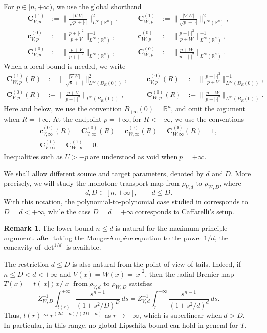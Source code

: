 \documentclass[11pt,a4paper,reqno]{amsart}
\numberwithin{equation}{section}
\theoremstyle{definition}
\newtheorem{remark}[theorem]{Remark}
\newcommand{\<}{\ensuremath \leq}
\renewcommand{\>}{\ensuremath \geq}
\newcommand{\Znorm}[2]{Z_{#1,#2}}
\newcommand{\CVp}[1]{\mathbf{C}_{V,#1}}
\newcommand{\CWp}[1]{\mathbf{C}_{W,#1}}
\newcommand{\cVp}[1]{\mathbf{c}_{V,#1}}
\newcommand{\cWp}[1]{\mathbf{c}_{W,#1}}
\begin{document}
For $p\in[n,+\infty)$, we use the global shorthand
\[
\begin{aligned}
\CVp{p}^{(1)}&:=\Biggl\| \frac{|\nabla V|}{\sqrt p+|\cdot|}\Biggr\|_{L^\infty(\mathbb{R}^n)}^2,
\qquad&
\CWp{p}^{(1)}&:=\Biggl\| \frac{|\nabla W|}{\sqrt p+|\cdot|}\Biggr\|_{L^\infty(\mathbb{R}^n)}^2,\\[1.2em]
\cVp{p}^{(0)}&:=\Biggl\|\frac{p+|\cdot|^2}{p+V}\Biggr\|_{L^\infty(\mathbb{R}^n)}^{-1},
\qquad&
\cWp{p}^{(0)}&:=\Biggl\|\frac{p+|\cdot|^2}{p+W}\Biggr\|_{L^\infty(\mathbb{R}^n)}^{-1},\\[1.2em]
\CVp{p}^{(0)}&:=\Biggl\|\frac{p+V}{p+|\cdot|^2}\Biggr\|_{L^\infty(\mathbb{R}^n)},
\qquad&
\CWp{p}^{(0)}&:=\Biggl\|\frac{p+W}{p+|\cdot|^2}\Biggr\|_{L^\infty(\mathbb{R}^n)}.
\end{aligned}
\]
When a local bound is needed, we write
\[
\begin{aligned}
\CWp{p}^{(1)}(R)&:=\Biggl\| \frac{|\nabla W|}{\sqrt p+|\cdot|}\Biggr\|_{L^\infty(B_R(0))}^2,
\qquad&
\cVp{p}^{(0)}(R)&:=\Biggl\|\frac{p+|\cdot|^2}{p+V}\Biggr\|_{L^\infty(B_R(0))}^{-1},\\[1.2em]
\CVp{p}^{(0)}(R)&:=\Biggl\|\frac{p+V}{p+|\cdot|^2}\Biggr\|_{L^\infty(B_R(0))},
\qquad&
\CWp{p}^{(0)}(R)&:=\Biggl\|\frac{p+W}{p+|\cdot|^2}\Biggr\|_{L^\infty(B_R(0))}.
\end{aligned}
\]
Here and below, we use the convention $B_{+\infty}(0)=\mathbb{R}^n$, and omit the argument when $R=+\infty$.
At the endpoint $p=+\infty$, for $R<+\infty$, we use the conventions
\[
\begin{gathered}
\cVp{\infty}^{(0)}(R)=\CVp{\infty}^{(0)}(R)
=\cWp{\infty}^{(0)}(R)=\CWp{\infty}^{(0)}(R)=1,\\
\CVp{\infty}^{(1)}=\CWp{\infty}^{(1)}=0.
\end{gathered}
\]
Inequalities such as $U>-p$ are understood as void when $p=+\infty$.

We shall allow different source and target parameters, denoted by $d$ and $D$. More precisely, we will study the monotone transport map from $\rho_{V,d}$ to $\rho_{W,D}$, where
\[
    d,D\in[n,+\infty], \qquad d\le D.
\]
With this notation, the polynomial-to-polynomial case studied in \cite{Alessio_Carlier_Santa,Fathi} corresponds to $D=d<+\infty$, while the case $D=d=+\infty$ corresponds to Caffarelli's setup.

\begin{remark}
The lower bound $n\le d$ is natural for the maximum-principle argument: after taking the Monge-Amp\`ere equation to the power $1/d$, the concavity of $\det^{1/d}$ is available.

The restriction $d\le D$ is also natural from the point of view of tails. Indeed, if $n\le D<d<+\infty$ and $V(x)=W(x)=|x|^2$, then the radial Brenier map $T(x)=t(|x|)x/|x|$ from $\rho_{V,d}$ to $\rho_{W,D}$ satisfies
\[
    \Znorm{W}{D}^{-1}\int_{t(r)}^{+\infty}\frac{s^{n-1}}{(1+s^2/D)^D}\,ds
    =
    \Znorm{V}{d}^{-1}\int_r^{+\infty}\frac{s^{n-1}}{(1+s^2/d)^d}\,ds.
\]
Thus, $t(r)\simeq r^{(2d-n)/(2D-n)}$ as $r\to+\infty$, which is superlinear when $d>D$. In particular, in this range, no global Lipschitz bound can hold in general for $T$.
\end{remark}
\end{document}
